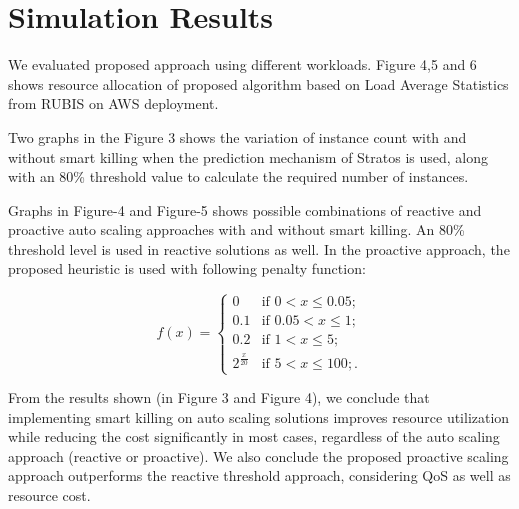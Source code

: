 \section{Simulation Results}
We evaluated proposed approach using different workloads. Figure 4,5 and 6 shows resource allocation of proposed algorithm based on Load Average Statistics from RUBIS on AWS deployment.

Two graphs in the Figure 3 shows the variation of instance count with and without smart killing when the prediction mechanism of Stratos is used, along with an 80\% threshold value to calculate the required number of instances.

Graphs in Figure-4  and Figure-5 shows possible combinations of reactive and proactive auto scaling approaches with and without smart killing. An 80\% threshold level is used in reactive solutions as well. In the proactive approach, the proposed heuristic is used with following penalty function:

$$f(x) = \begin{cases} 
0 & \text{if $0 < x \le 0.05$}; \\
0.1 & \text{if $0.05 < x \le 1$}; \\
0.2 & \text{if $1 < x \le 5$};\\
2^{\frac{x}{20}} & \text{if $5 < x \le 100$};.\end{cases} $$

From the results shown (in Figure 3 and Figure 4), we conclude that implementing smart killing on auto scaling solutions improves resource utilization while reducing the cost significantly in most cases, regardless of the auto scaling approach (reactive or proactive). We also conclude the proposed proactive scaling approach outperforms the reactive threshold approach, considering QoS as well as resource cost.